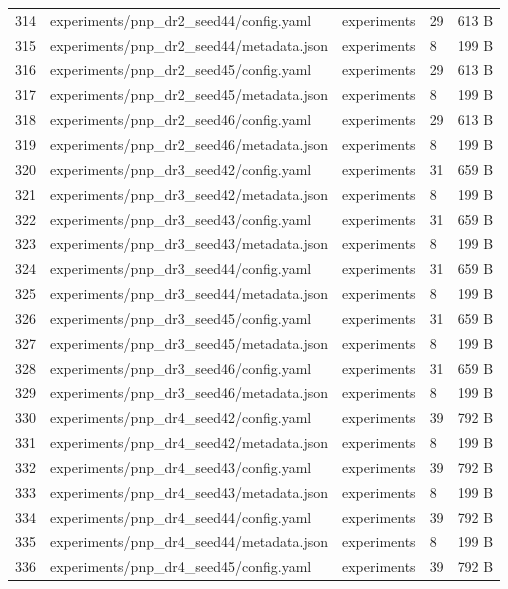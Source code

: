 \documentclass[11pt,a4paper,oneside]{book}
\begin{document}
\begin{longtable}{l l l l l}
314 & experiments/pnp\_dr2\_seed44/config.yaml & experiments & 29 & 613 B \\
315 & experiments/pnp\_dr2\_seed44/metadata.json & experiments & 8 & 199 B \\
316 & experiments/pnp\_dr2\_seed45/config.yaml & experiments & 29 & 613 B \\
317 & experiments/pnp\_dr2\_seed45/metadata.json & experiments & 8 & 199 B \\
318 & experiments/pnp\_dr2\_seed46/config.yaml & experiments & 29 & 613 B \\
319 & experiments/pnp\_dr2\_seed46/metadata.json & experiments & 8 & 199 B \\
320 & experiments/pnp\_dr3\_seed42/config.yaml & experiments & 31 & 659 B \\
321 & experiments/pnp\_dr3\_seed42/metadata.json & experiments & 8 & 199 B \\
322 & experiments/pnp\_dr3\_seed43/config.yaml & experiments & 31 & 659 B \\
323 & experiments/pnp\_dr3\_seed43/metadata.json & experiments & 8 & 199 B \\
324 & experiments/pnp\_dr3\_seed44/config.yaml & experiments & 31 & 659 B \\
325 & experiments/pnp\_dr3\_seed44/metadata.json & experiments & 8 & 199 B \\
326 & experiments/pnp\_dr3\_seed45/config.yaml & experiments & 31 & 659 B \\
327 & experiments/pnp\_dr3\_seed45/metadata.json & experiments & 8 & 199 B \\
328 & experiments/pnp\_dr3\_seed46/config.yaml & experiments & 31 & 659 B \\
329 & experiments/pnp\_dr3\_seed46/metadata.json & experiments & 8 & 199 B \\
330 & experiments/pnp\_dr4\_seed42/config.yaml & experiments & 39 & 792 B \\
331 & experiments/pnp\_dr4\_seed42/metadata.json & experiments & 8 & 199 B \\
332 & experiments/pnp\_dr4\_seed43/config.yaml & experiments & 39 & 792 B \\
333 & experiments/pnp\_dr4\_seed43/metadata.json & experiments & 8 & 199 B \\
334 & experiments/pnp\_dr4\_seed44/config.yaml & experiments & 39 & 792 B \\
335 & experiments/pnp\_dr4\_seed44/metadata.json & experiments & 8 & 199 B \\
336 & experiments/pnp\_dr4\_seed45/config.yaml & experiments & 39 & 792 B \\

\end{longtable}
\end{document}
